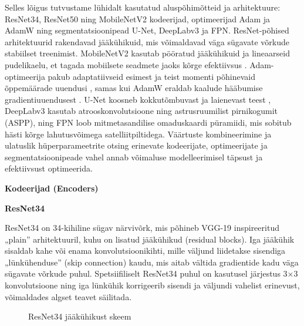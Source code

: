 Selles lõigus tutvustame lühidalt kasutatud aluspõhimõtteid ja arhitektuure:
ResNet34, ResNet50 ning MobileNetV2 kodeerijad, optimeerijad Adam ja AdamW ning
segmentatsioonipead U-Net, DeepLabv3 ja FPN\@. ResNet-põhised arhitektuurid
rakendavad jääkühikuid, mis võimaldavad väga sügavate võrkude stabiilset
treenimist. MobileNetV2 kasutab pööratud jääkühikuid ja lineaarseid pudelikaelu,
et tagada mobiilsete seadmete jaoks kõrge efektiivsus . Adam-optimeerija pakub
adaptatiivseid esimest ja teist momenti põhinevaid õppemäärade uuendusi , samas
kui AdamW eraldab kaalude hääbumise gradientiuuendusest . U-Net koosneb
kokkutõmbuvast ja laienevast teest , DeepLabv3 kasutab atrooskonvolutsioone ning
astrusruumilist pirnikogumit (ASPP), ning FPN loob mitmetasandilise omaduskaardi
püramiidi, mis sobitub hästi kõrge lahutusvõimega satelliitpiltidega. Väärtuste
kombineerimine ja ulatuslik hüperparameetrite otsing erinevate kodeerijate,
optimeerijate ja segmentatsioonipeade vahel annab võimaluse modelleerimisel
täpsust ja efektiivsust optimeerida.

\textbf{Kodeerijad (Encoders)}

\textbf{ResNet34}

ResNet34 on 34-kihiline sügav närvivõrk, mis põhineb VGG-19 inspireeritud „plain” arhitektuuril, kuhu on lisatud jääkühikud (residual blocks). Iga jääkühik sisaldab kahe või enama konvolutsioonikihti, mille väljund liidetakse sisendiga „lünkühenduse” (skip connection) kaudu, mis aitab vältida gradientide kadu väga sügavate võrkude puhul. Spetsiifiliselt ResNet34 puhul on kasutusel järjestus 3×3 konvolutsioone ning iga lünkühik korrigeerib sisendi ja väljundi vahelist erinevust, võimaldades algset teavet säilitada.


\begin{figure}[H]
    \centering

    \caption{ResNet34 jääkühikust skeem}
    \label{fig:ResNet34jääkühikust}
\end{figure}

